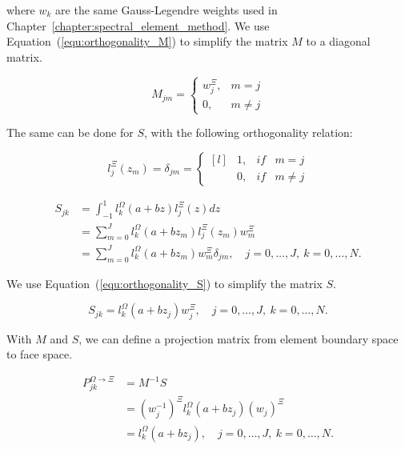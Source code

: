 \noindent
where \(w_k\) are the same Gauss-Legendre weights used in
Chapter~\ref{chapter:spectral_element_method}. We use Equation~(\ref{equ:orthogonality_M}) to
simplify the matrix \(M\) to a diagonal matrix.

\begin{equation}
	M_{jm} = \left \{ \begin{matrix}
	w_j^{\Xi }, &  m = j \\ 
	0, & m \neq  j
	\end{matrix}\right.
\end{equation}

\noindent
The same can be done for \(S\), with the following orthogonality relation:

\begin{equation} \label{equ:orthogonality_S}
	l_j ^ \Xi (z_m) = \delta_{jm} = \left \{ \begin{matrix*}[l]
	& 1, & if & m = j\\ 
	& 0, & if & m \neq j
	\end{matrix*}\right.
\end{equation}

\begin{equation} \label{equ:matrix_S}
	\begin{aligned}
		S_{jk} &= \int_{-1}^{1} l_k ^ \Omega \left( a + b z \right) l_j ^ \Xi \left( z \right) dz \\
		&= \sum_{m = 0}^{J} l_k ^ \Omega \left( a + b z_m \right) l_j ^ \Xi \left( z_m \right) w_m ^ \Xi \\
		&= \sum_{m = 0}^{J} l_k ^ \Omega \left( a + b z_m \right) w_m ^{\Xi} \delta_{jm}, \quad j = 0, \ldots, J, \: k = 0, \ldots, N.
	\end{aligned}
\end{equation}

\noindent
We use Equation~(\ref{equ:orthogonality_S}) to simplify the matrix \(S\).

\begin{equation}
	S_{jk} = l_k^{\Omega } \left( a + bz_j \right) w_j^{\Xi}, \quad j = 0, \ldots, J, \: k = 0, \ldots, N.
\end{equation}

With \(M\) and \(S\), we can define a projection matrix from element boundary space to face space.

\begin{equation}
	\begin{aligned}
		P_{jk} ^ {\Omega \rightarrow \Xi} &= M^{-1}S \\
		&= {\left( w_j ^{-1} \right)}^{\Xi }  l_k ^ \Omega \left( a + b z_j \right) {\left( w_j \right)}^{\Xi} \\
		&= l_k ^ \Omega \left(a + b z_j \right), \quad j = 0, \ldots, J, \: k = 0, \ldots, N.
	\end{aligned}
\end{equation}

